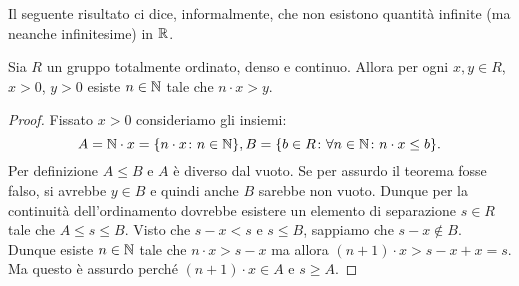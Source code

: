 Il seguente risultato ci dice, informalmente, che non 
esistono quantità infinite (ma neanche infinitesime) in ${\mathbb R}$.
%
\begin{theorem}
  \label{th:archimede}%
  \mymark{**}%
    Sia $R$ un gruppo totalmente ordinato, denso e continuo.
  Allora per ogni $x,y\in R$, $x>0$, $y>0$ 
  esiste $n\in {\mathbb N}$ tale che $n\cdot x > y$.
\end{theorem}
%
\begin{proof}
\mymark{*}%
Fissato $x>0$ consideriamo gli insiemi:
\[
A = {\mathbb N}\cdot x = {\left\{ n\cdot x\colon n\in {\mathbb N} \right\}},
B = {\left\{ b\in R\colon \forall n\in{\mathbb N}\colon n \cdot x \le b  \right\}}.
\]
Per definizione $A\le B$ e $A$ è diverso dal vuoto.
Se per assurdo il teorema fosse falso, si avrebbe $y\in B$ 
e quindi anche $B$ sarebbe non vuoto.
Dunque per la continuità dell'ordinamento dovrebbe esistere 
un elemento di separazione $s\in R$ tale che $A\le s\le B$.
Visto che $s-x<s$ e $s\le B$,
sappiamo che $s-x \not \in B$.
Dunque esiste $n\in {\mathbb N}$ tale che $n\cdot x > s-x$
ma allora $(n+1)\cdot x > s-x+x=s$. 
Ma questo è assurdo perché $(n+1)\cdot x\in A$ e $s\ge A$.
%
%
\end{proof}

